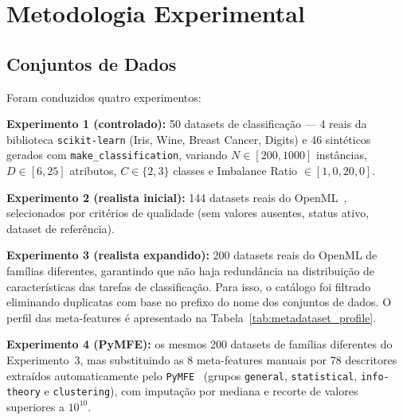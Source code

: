 \documentclass[12pt]{article}
\begin{document}
\section{Metodologia Experimental}

\subsection{Conjuntos de Dados}

Foram conduzidos quatro experimentos:

\textbf{Experimento 1 (controlado):} 50 datasets de classificação --- 4 reais da biblioteca \texttt{scikit-learn} (Iris, Wine, Breast Cancer, Digits) e 46 sintéticos gerados com \texttt{make\_classification}, variando $N \in [200, 1000]$ instâncias, $D \in [6, 25]$ atributos, $C \in \{2, 3\}$ classes e Imbalance Ratio $\in [1{,}0, 20{,}0]$.

\textbf{Experimento 2 (realista inicial):} 144 datasets reais do OpenML~\cite{vanschoren2014openml}, selecionados por critérios de qualidade (sem valores ausentes, status ativo, dataset de referência).

\textbf{Experimento 3 (realista expandido):} 200 datasets reais do OpenML de famílias diferentes, garantindo que não haja redundância na distribuição de características das tarefas de classificação. Para isso, o catálogo foi filtrado eliminando duplicatas com base no prefixo do nome dos conjuntos de dados. O perfil das meta-features é apresentado na Tabela~\ref{tab:metadataset_profile}.

\textbf{Experimento 4 (PyMFE):} os mesmos 200 datasets de famílias diferentes do Experimento~3, mas substituindo as 8 meta-features manuais por 78 descritores extraídos automaticamente pelo \texttt{PyMFE}~\cite{pymfe2020} (grupos \texttt{general}, \texttt{statistical}, \texttt{info-theory} e \texttt{clustering}), com imputação por mediana e recorte de valores superiores a $10^{10}$.
\end{document}
